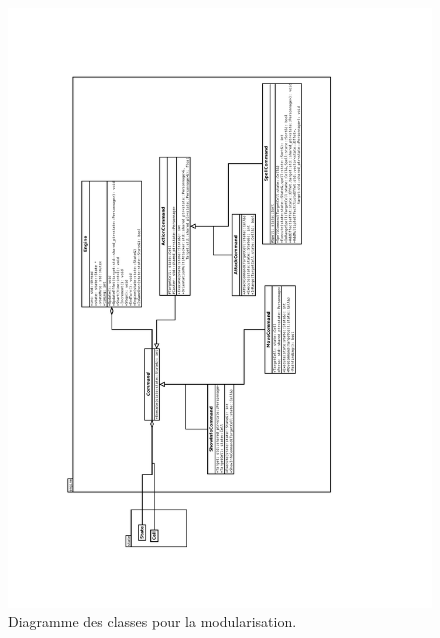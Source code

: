 \documentclass[a4paper,12pt]{article}
\begin{document}
\begin{landscape}
\begin{figure}[p]
\includegraphics[width=0.9\paperwidth,angle=270]{module.pdf}
\caption{\label{uml:module}Diagramme des classes pour la modularisation.} 
\end{figure}
\end{landscape}
\end{document}
